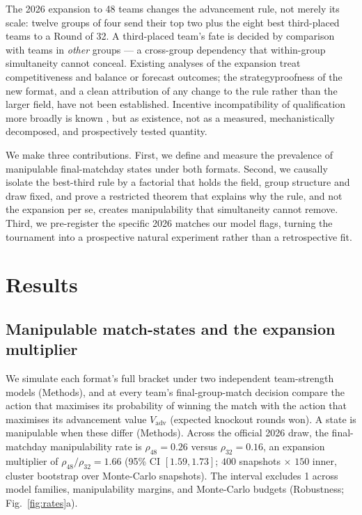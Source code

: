 \documentclass[11pt]{article}
\begin{document}
The 2026 expansion to 48 teams changes the advancement rule, not merely its scale: twelve groups of
four send their top two plus the eight best third-placed teams to a Round of 32. A third-placed
team's fate is decided by comparison with teams in \emph{other} groups --- a cross-group dependency
that within-group simultaneity cannot conceal. Existing analyses of the expansion treat
competitiveness and balance \cite{csato2025imbalanced} or forecast outcomes; the strategyproofness
of the new format, and a clean attribution of any change to the rule rather than the larger field,
have not been established. Incentive incompatibility of qualification more broadly is known
\cite{dagaev2018winning,pauly2014roundrobin,vong2017strategic,guyon2015rethinking}, but as
existence, not as a measured, mechanistically decomposed, and prospectively tested quantity.

We make three contributions. First, we define and measure the prevalence of manipulable
final-matchday states under both formats. Second, we causally isolate the best-third rule by a
factorial that holds the field, group structure and draw fixed, and prove a restricted theorem that
explains why the rule, and not the expansion per se, creates manipulability that simultaneity cannot
remove. Third, we pre-register the specific 2026 matches our model flags, turning the tournament
into a prospective natural experiment rather than a retrospective fit.

\section*{Results}
\subsection*{Manipulable match-states and the expansion multiplier}
We simulate each format's full bracket under two independent team-strength models (Methods), and at
every team's final-group-match decision compare the action that maximises its probability of winning
the match with the action that maximises its advancement value $V_{\mathrm{adv}}$ (expected knockout
rounds won). A state is manipulable when these differ (Methods). Across the official 2026 draw, the
final-matchday manipulability rate is $\rho_{48}=0.26$ versus $\rho_{32}=0.16$, an expansion
multiplier of $\rho_{48}/\rho_{32}=1.66$ (95\% CI $[1.59,1.73]$; $400$ snapshots $\times$ $150$ inner,
cluster bootstrap over Monte-Carlo snapshots). The interval excludes 1 across model families,
manipulability margins, and Monte-Carlo budgets (Robustness; Fig.~\ref{fig:rates}a).
\end{document}
